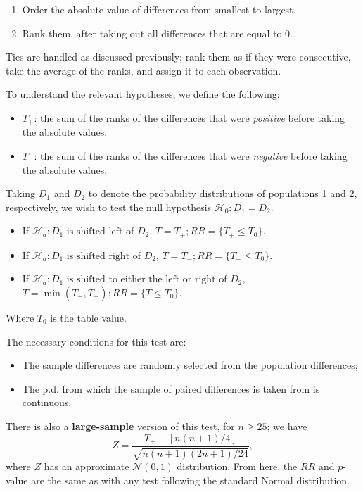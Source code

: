 \documentclass[12pt]{article}
\begin{document}
\begin{enumerate}
    \item Order the absolute value of differences from smallest to largest.
    \item Rank them, after taking out all differences that are equal to 0.
\end{enumerate}

Ties are handled as discussed previously; rank them as if they were consecutive, take the average of the ranks, and assign it to each observation.

To understand the relevant hypotheses, we define the following: \begin{itemize}
    \item $T_+$: the sum of the ranks of the differences that were \textit{positive} before taking the absolute values.
    \item $T_-$: the sum of the ranks of the differences that were \textit{negative} before taking the absolute values.
\end{itemize}

Taking $D_1$ and $D_2$ to denote the probability distributions of populations 1 and 2, respectively, we wish to test the null hypothesis $\mathcal{H}_0: D_1 = D_2$. \begin{itemize}
    \item If $\mathcal{H}_a: D_1 \text{ is shifted left of } D_2$, $T = T_+; RR = \{T_+ \leq T_0\}$.
    \item If $\mathcal{H}_a: D_1 \text{ is shifted right of } D_2$, $T = T_-; RR = \{T_- \leq T_0\}$.
    \item If $\mathcal{H}_a: D_1 \text{ is shifted to either the left or right of } D_2$, $T = \min(T_-, T_+); RR = \{T \leq T_0\}$.
\end{itemize}

Where $T_0$ is the table value.

The necessary conditions for this test are: \begin{itemize}
    \item The sample differences are randomly selected from the population differences;
    \item The p.d. from which the sample of paired differences is taken from is continuous.
\end{itemize}

There is also a \textbf{large-sample} version of this test, for $n \geq 25$; we have \[Z = \frac{T_+ - [n(n+1)/4]}{\sqrt{n(n+1)(2n+1)/24}},\] where $Z$ has an approximate $\mathcal{N}(0,1)$ distribution. From here, the $RR$ and $p$-value are the same as with any test following the standard Normal distribution.
\end{document}
